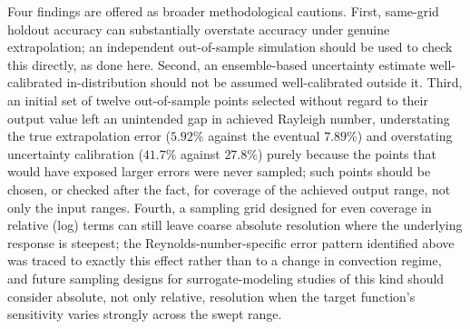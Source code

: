 Four findings are offered as broader methodological cautions. First, same-grid holdout accuracy can substantially overstate accuracy under genuine extrapolation; an independent out-of-sample simulation should be used to check this directly, as done here. Second, an ensemble-based uncertainty estimate well-calibrated in-distribution should not be assumed well-calibrated outside it. Third, an initial set of twelve out-of-sample points selected without regard to their output value left an unintended gap in achieved Rayleigh number, understating the true extrapolation error ($5.92\%$ against the eventual $7.89\%$) and overstating uncertainty calibration ($41.7\%$ against $27.8\%$) purely because the points that would have exposed larger errors were never sampled; such points should be chosen, or checked after the fact, for coverage of the achieved output range, not only the input ranges. Fourth, a sampling grid designed for even coverage in relative (log) terms can still leave coarse absolute resolution where the underlying response is steepest; the Reynolds-number-specific error pattern identified above was traced to exactly this effect rather than to a change in convection regime, and future sampling designs for surrogate-modeling studies of this kind should consider absolute, not only relative, resolution when the target function's sensitivity varies strongly across the swept range.
